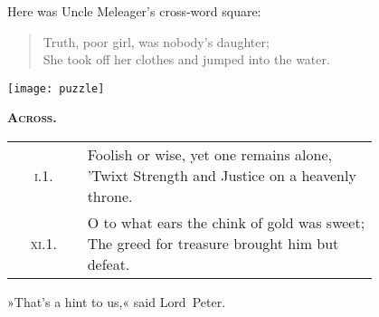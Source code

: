 \vfill

Here was Uncle Meleager's cross-word square:

\begin{quote}
Truth, poor girl, was nobody's daughter;\\
She took off her clothes and jumped into the water.\\
\end{quote}

\begin{center}
\texttt{[image: puzzle]}
\end{center}

\pagebreak[2]

{\scshape\large\bfseries Across.}

\def\arraystretch{2.5}
	
\begin{longtable} {c p{0.8\linewidth}} 
\textsc{i}.1. & \makecell[l]{Foolish or wise, yet one remains alone,\\'Twixt Strength and Justice on a heavenly throne.}\\
\textsc{xi}.1. & \makecell[l]{O to what ears the chink of gold was sweet;\\
The greed for treasure brought him but defeat.}\\
\end{longtable}

»That's a hint to us,« said Lord~Peter.

